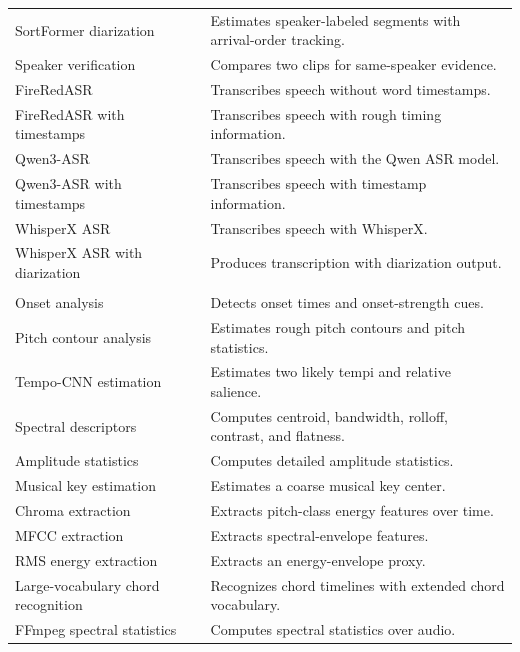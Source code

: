 \documentclass[11pt]{article}
\begin{document}
\begin{table}[t]
\begin{tabularx}{\textwidth}{>{\raggedright\arraybackslash}p{}>{\raggedright\arraybackslash}X}
SortFormer diarization~\citep{park2025sortformer} & Estimates speaker-labeled segments with arrival-order tracking. \\
Speaker verification~\citep{wang2023wespeaker} & Compares two clips for same-speaker evidence. \\
FireRedASR~\citep{xu2025fireredasr,xu2026fireredasr2s} & Transcribes speech without word timestamps. \\
FireRedASR with timestamps~\citep{xu2026fireredasr2s} & Transcribes speech with rough timing information. \\
Qwen3-ASR~\citep{shi2026qwen3asr} & Transcribes speech with the Qwen ASR model. \\
Qwen3-ASR with timestamps~\citep{shi2026qwen3asr} & Transcribes speech with timestamp information. \\
WhisperX ASR~\citep{bain2023whisperx} & Transcribes speech with WhisperX. \\
WhisperX ASR with diarization~\citep{bain2023whisperx,bredin2023pyannote,plaquet2023powerset} & Produces transcription with diarization output. \\
\midrule
\multicolumn{2}{c}{\emph{Acoustic/music feature analysis}} \\
\cmidrule(lr){1-2}
Onset analysis & Detects onset times and onset-strength cues. \\
Pitch contour analysis & Estimates rough pitch contours and pitch statistics. \\
Tempo-CNN estimation~\citep{schreiber2018tempocnn} & Estimates two likely tempi and relative salience. \\
Spectral descriptors & Computes centroid, bandwidth, rolloff, contrast, and flatness. \\
Amplitude statistics & Computes detailed amplitude statistics. \\
Musical key estimation & Estimates a coarse musical key center. \\
Chroma extraction & Extracts pitch-class energy features over time. \\
MFCC extraction & Extracts spectral-envelope features. \\
RMS energy extraction & Extracts an energy-envelope proxy. \\
Large-vocabulary chord recognition~\citep{jiang2019largevocabularychord} & Recognizes chord timelines with extended chord vocabulary. \\
FFmpeg spectral statistics & Computes spectral statistics over audio. \\

\end{tabularx}
\end{table}
\end{document}
